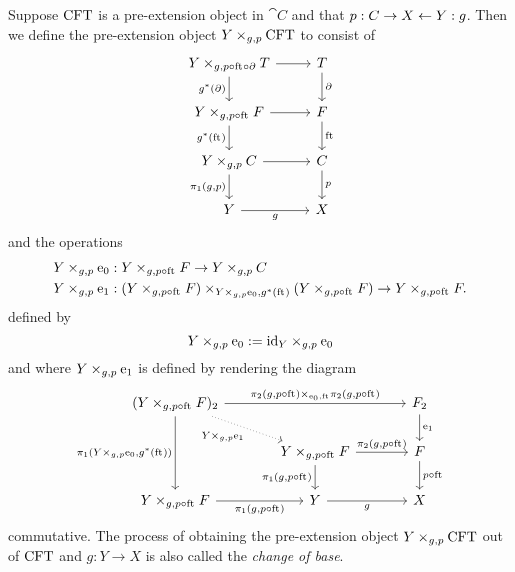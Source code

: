 \begin{defn}\label{cobesys}
Suppose $\mathrm{CFT}$ is a pre-extension object in $\cat{C}$ and that 
$p:C\rightarrow X\leftarrow Y:g$.
Then we define the pre-extension object $\cobesys{Y}{\stesys}{g}{p}$ to consist of
\begin{equation*}
\begin{tikzcd}
\cobesys{Y}{\stesyst}{g}{p\circ\eft\circ\ebd}
  \ar{r}
  \ar{d}[swap]{g^\ast(\ebd)}
  &
\stesyst
  \ar{d}{\ebd}
  \\
\cobesys{Y}{\stesysf}{g}{p\circ\eft}
  \ar{r}
  \ar{d}[swap]{g^\ast(\eft)}
  &
\stesysf
  \ar{d}{\eft}
  \\
\cobesys{Y}{\stesysc}{g}{p}
  \ar{r}
  \ar{d}[swap]{\pullbackpr{1}{g}{p}}
  &
\stesysc
  \ar{d}{p}
  \\
Y \ar{r}[swap]{g}
  &
X
\end{tikzcd}
\end{equation*} 
and the operations
\begin{align*}
\cobesys{Y}{\ectxext}{g}{p} 
  & : \pullback{Y}{\stesysf}{g}{p\circ\eft}\to \pullback{Y}{\stesysc}{g}{p}\\
\cobesys{Y}{\efamext}{g}{p} 
  & : \pullback
    {\pullback{Y}{\stesysf}{g}{p\circ\eft}}
    {\pullback{Y}{\stesysf}{g}{p\circ\eft}}
    {\cobesys{Y}{\ectxext}{g}{p}}
    {g^\ast(\eft)}
  \to 
  \pullback{Y}{\stesysf}{g}{p\circ\eft}.
\end{align*}
defined by
\begin{equation*}
\cobesys{Y}{\ectxext}{g}{p} := \pullback{\catid{Y}}{\ectxext}{g}{p}
\end{equation*}
and where $\cobesys{Y}{\efamext}{g}{p}$ is defined by rendering the diagram
\begin{equation*}
\begin{tikzcd}[column sep=large]
(\cobesys{Y}{\stesysf}{g}{p\circ\eft})_2
  \ar{rr}{\pullback{\pullbackpr{2}{g}{p\circ\eft}}{\pullbackpr{2}{g}{p\circ\eft}}{\ectxext}{\eft}}
  \ar{dd}[swap]{\pullbackpr{1}{\cobesys{Y}{\ectxext}{g}{p}}{g^\ast(\eft)}}
  \ar[dotted]{dr}[swap]{\cobesys{Y}{\efamext}{g}{p}}
  &
  &
\stesysf_2
  \ar{d}{\efamext}
  \\
  {}&
\cobesys{Y}{\stesysf}{g}{p\circ\eft}
  \ar{r}{\pullbackpr{2}{g}{p\circ\eft}}
  \ar{d}[swap]{\pullbackpr{1}{g}{p\circ\eft}}
  &
\stesysf
  \ar{d}{p\circ\eft}
  \\
\cobesys{Y}{\stesysf}{g}{p\circ\eft}
  \ar{r}[swap]{\pullbackpr{1}{g}{p\circ\eft}}
  &
Y \ar{r}[swap]{g}
  &
X
\end{tikzcd}
\end{equation*} 
commutative. 
The process of obtaining the pre-extension object $\cobesys{Y}{\stesys}{g}{p}$ out of $\mathrm{CFT}$
and $g:Y\to X$ is also called the \emph{change of base}.
\end{defn}

